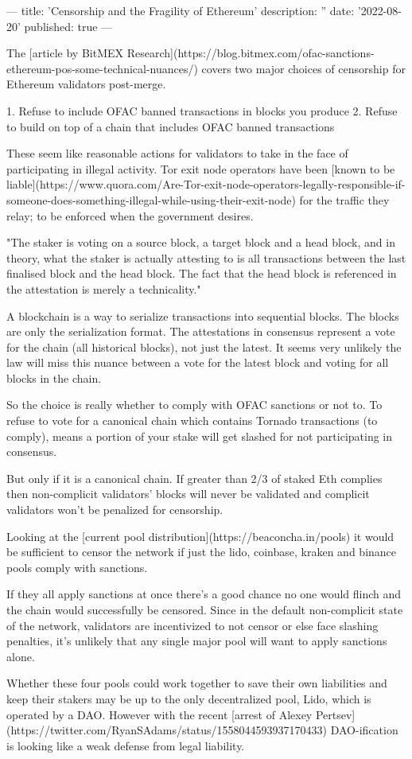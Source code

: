 ---
title: 'Censorship and the Fragility of Ethereum'
description: ''
date: '2022-08-20'
published: true
---

The [article by BitMEX Research](https://blog.bitmex.com/ofac-sanctions-ethereum-pos-some-technical-nuances/) covers two major choices of censorship for Ethereum validators post-merge.

1. Refuse to include OFAC banned transactions in blocks you produce
2. Refuse to build on top of a chain that includes OFAC banned transactions

These seem like reasonable actions for validators to take in the face of participating in illegal activity. Tor exit node operators have been [known to be liable](https://www.quora.com/Are-Tor-exit-node-operators-legally-responsible-if-someone-does-something-illegal-while-using-their-exit-node) for the traffic they relay; to be enforced when the government desires.

"The staker is voting on a source block, a target block and a head block, and in theory, what the staker is actually attesting to is all transactions between the last finalised block and the head block. The fact that the head block is referenced in the attestation is merely a technicality."

A blockchain is a way to serialize transactions into sequential blocks. The blocks are only the serialization format. The attestations in consensus represent a vote for the chain (all historical blocks), not just the latest. It seems very unlikely the law will miss this nuance between a vote for the latest block and voting for all blocks in the chain.

So the choice is really whether to comply with OFAC sanctions or not to. To refuse to vote for a canonical chain which contains Tornado transactions (to comply), means a portion of your stake will get slashed for not participating in consensus.

But only if it is a canonical chain. If greater than 2/3 of staked Eth complies then non-complicit validators' blocks will never be validated and complicit validators won't be penalized for censorship.

Looking at the [current pool distribution](https://beaconcha.in/pools) it would be sufficient to censor the network if just the lido, coinbase, kraken and binance pools comply with sanctions.

If they all apply sanctions at once there's a good chance no one would flinch and the chain would successfully be censored. Since in the default non-complicit state of the network, validators are incentivized to not censor or else face slashing penalties, it's unlikely that any single major pool will want to apply sanctions alone.

Whether these four pools could work together to save their own liabilities and keep their stakers may be up to the only decentralized pool, Lido, which is operated by a DAO. However with the recent [arrest of Alexey Pertsev](https://twitter.com/RyanSAdams/status/1558044593937170433) DAO-ification is looking like a weak defense from legal liability.
